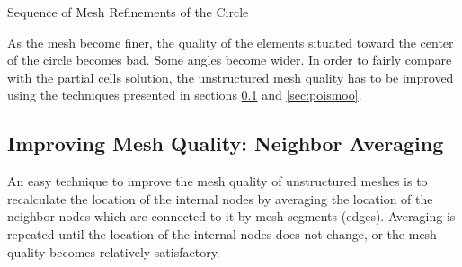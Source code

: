 \documentclass[a4paper,12pt]{article}
\makeatletter
\newenvironment{figurehere}
  {\def\@captype{figure}}
  {}
\makeatother
\begin{document}
\begin{center}
\begin{figurehere}
\caption{Sequence of Mesh Refinements of the Circle}\label{fig:refine}
\end{figurehere}
\end{center}
As the mesh become finer, the quality of the elements situated toward the center of the circle becomes bad. Some angles become wider. In order to fairly compare with the partial cells solution, the unstructured mesh quality has to be improved using the techniques presented in sections \ref{sec:neighavg} and \ref{sec:poismoo}.
\subsection{Improving Mesh Quality: Neighbor Averaging}\label{sec:neighavg}
An easy technique to improve the mesh quality of unstructured meshes is to recalculate the location of the internal nodes by averaging the location of the neighbor nodes which are connected to it by mesh segments (edges). Averaging is repeated until the location of the internal nodes does not change, or the mesh quality becomes relatively satisfactory.\\
\end{document}
